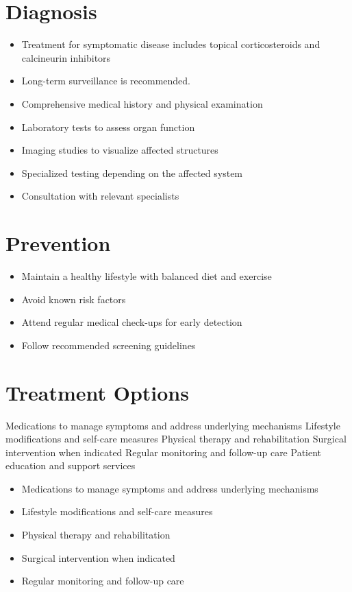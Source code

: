 \section{Diagnosis}
\begin{itemize}[noitemsep]
  \item Treatment for symptomatic disease includes topical corticosteroids and calcineurin inhibitors
  \item Long-term surveillance is recommended.
  \item Comprehensive medical history and physical examination
  \item Laboratory tests to assess organ function
  \item Imaging studies to visualize affected structures
  \item Specialized testing depending on the affected system
  \item Consultation with relevant specialists
\end{itemize}
\section{Prevention}
\begin{itemize}[noitemsep]
  \item Maintain a healthy lifestyle with balanced diet and exercise
  \item Avoid known risk factors
  \item Attend regular medical check-ups for early detection
  \item Follow recommended screening guidelines
\end{itemize}
\section{Treatment Options}
Medications to manage symptoms and address underlying mechanisms Lifestyle modifications and self-care measures Physical therapy and rehabilitation Surgical intervention when indicated Regular monitoring and follow-up care Patient education and support services

\begin{itemize}[noitemsep]
  \item Medications to manage symptoms and address underlying mechanisms
  \item Lifestyle modifications and self-care measures
  \item Physical therapy and rehabilitation
  \item Surgical intervention when indicated
  \item Regular monitoring and follow-up care
\end{itemize}
